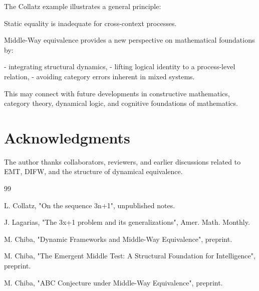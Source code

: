 \documentclass[11pt]{article}
\theoremstyle{definition}
\theoremstyle{remark}
\begin{document}
The Collatz example illustrates a general principle:

Static equality is inadequate for cross-context processes.

Middle-Way equivalence provides a new perspective on mathematical
foundations by:

- integrating structural dynamics,
- lifting logical identity to a process-level relation,
- avoiding category errors inherent in mixed systems.

This may connect with future developments in constructive mathematics,
category theory, dynamical logic, and cognitive foundations of
mathematics.

\section{Acknowledgments}

The author thanks collaborators, reviewers, and earlier discussions
related to EMT, DIFW, and the structure of dynamical equivalence.

\begin{thebibliography}{99}

L. Collatz, "On the sequence 3n+1", unpublished notes.

J. Lagarias, "The 3x+1 problem and its generalizations", Amer. Math.
Monthly.

M. Chiba, "Dynamic Frameworks and Middle-Way Equivalence", preprint.

M. Chiba, "The Emergent Middle Test: A Structural Foundation for
Intelligence", preprint.

M. Chiba, "ABC Conjecture under Middle-Way Equivalence", preprint.

\end{thebibliography}




\end{document}
